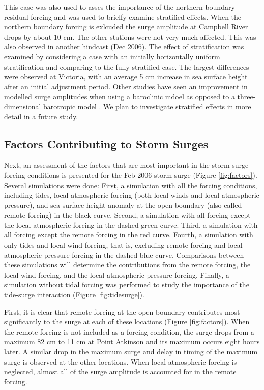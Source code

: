 \documentclass[letterpaper]{tATO2e}
\begin{document}
{\color{red} This case was also used to asses the importance of the northern boundary residual forcing and was used to brielfy examine stratified effects. When the northern boundary forcing is exlcuded the surge amplitude at Campbell River drops by about 10 cm. The other stations were not very much affected. This was also observed in another hindcast (Dec 2006). The effect of stratification was examined by considering a case with an initially horizontally uniform stratification and comparing to the fully stratified case. The largest differences were observed at Victoria, with an average 5 cm increase in sea surface height after an initial adjustment period. Other studies have seen an improvement in modelled surge amplitudes when using a baroclinic mdoel as opposed to a three-dimensional barotropic model \citep{ma2015oceanic}. We plan to investigate stratified effects in more detail in a future study.} 

\subsection{Factors Contributing to Storm Surges}\label{sec:factors}

Next, an assessment of the factors that are most important in the storm surge forcing conditions is presented for the Feb 2006 storm surge (Figure \ref{fig:factors}). Several simulations were done: First, a simulation with all the forcing conditions, including tides, local atmospheric forcing (both local winds and local atmospheric pressure), and sea surface height anomaly at the open boundary (also called remote forcing) in the black curve. Second, a simulation with all forcing except the local atmospheric forcing in the dashed green curve. Third, a simulation with all forcing except the remote forcing in the red curve. Fourth, a simulation with only tides and local wind forcing, that is, excluding remote forcing and local atmospheric pressure forcing in the dashed blue curve. {\color{red} Comparisons between these simulations will determine the contributions from the remote forcing, the local wind forcing, and the local atmospheric pressure forcing.} Finally, a simulation without tidal forcing was performed to study the importance of the tide-surge interaction (Figure \ref{fig:tidesurge}).  

First, it is clear that remote forcing at the open boundary contributes most significantly to the surge at each of these locations (Figure \ref{fig:factors}). When the remote forcing is not included as a forcing condition, the surge drops from a maximum 82 cm to 11 cm at Point Atkinson and its maximum occurs eight hours later.  A similar drop in the maximum surge and delay in timing of the maximum surge is observed at the other locations.  When local atmospheric forcing is neglected, almost all of the surge amplitude is accounted for in the remote forcing.
\end{document}
